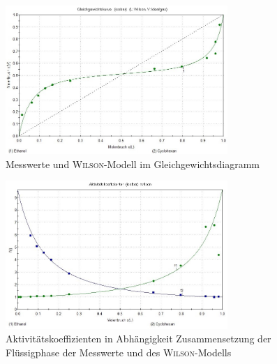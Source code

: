 \begin{figure}[h!]
	\centering
	\includegraphics[width=0.75\textwidth]{img/GGW_wilson}
	\caption{Messwerte und \textsc{Wilson}-Modell im Gleichgewichtsdiagramm}
	\label{fig:ggw_wilson}
\end{figure}
\FloatBarrier

\begin{figure}[h!]
	\centering
	\includegraphics[width=0.75\textwidth]{img/gamma_wilson}
	\caption{Aktivitätskoeffizienten in Abhängigkeit Zusammensetzung der Flüssigphase der Messwerte und des \textsc{Wilson}-Modells}
	\label{fig:gamma_wilson}
\end{figure}
\FloatBarrier
